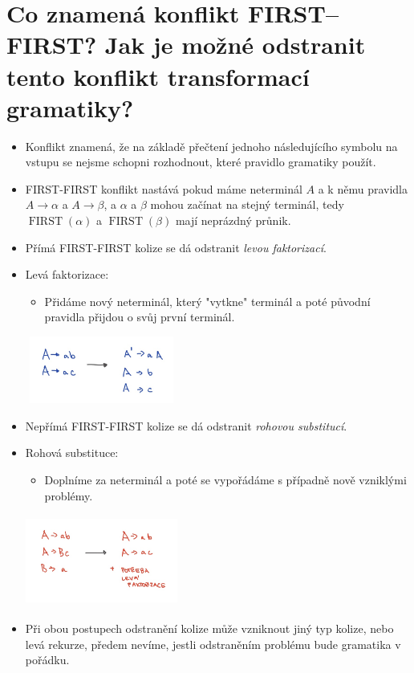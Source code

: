 \documentclass{article}
\begin{document}
\section{Co znamená konflikt FIRST–FIRST? Jak je možné odstranit tento konflikt transformací gramatiky?}
\begin{itemize}
  \item Konflikt znamená, že na základě přečtení jednoho následujícího symbolu na vstupu se nejsme schopni rozhodnout, které pravidlo gramatiky použít.
  \item FIRST-FIRST konflikt nastává pokud máme neterminál $A$ a k němu pravidla $A \rightarrow \alpha $ a $A \rightarrow \beta $, a $\alpha$ a $\beta$ mohou začínat na stejný terminál, tedy $\operatorname{FIRST}(\alpha)$ a $\operatorname{FIRST}(\beta)$ mají neprázdný průnik.
  \item Přímá FIRST-FIRST kolize se dá odstranit \emph{levou faktorizací}.
  \item Levá faktorizace:
  \begin{itemize}
      \item Přidáme nový neterminál, který "vytkne" terminál a poté původní pravidla přijdou o svůj první terminál.
  \end{itemize}
  \includegraphics[width=5cm, height=2.2cm]{leva_faktorizace.jpeg}
  \item Nepřímá FIRST-FIRST kolize se dá odstranit \emph{rohovou substitucí}.
  \item Rohová substituce:
  \begin{itemize}
      \item Doplníme za neterminál a poté se vypořádáme s případně nově vzniklými problémy.
  \end{itemize}
  \includegraphics[width=5cm, height=3cm]{rohova_substituce.jpeg}
  \item Při obou postupech odstranění kolize může vzniknout jiný typ kolize, nebo levá rekurze, předem nevíme, jestli odstraněním problému bude gramatika v pořádku.
\end{itemize}
\newpage
\end{document}
